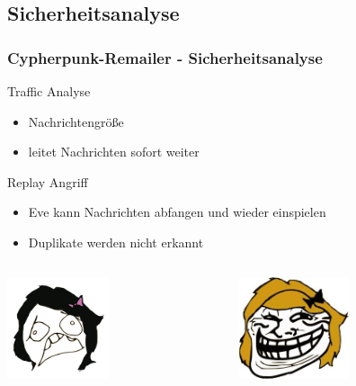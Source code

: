 \documentclass{beamer}
\begin{document}
\subsection{Sicherheitsanalyse}
\begin{frame}
	\frametitle{Cypherpunk-Remailer - Sicherheitsanalyse}
	\begin{alertblock}{Traffic Analyse}	
		\begin{itemize}	
			\item Nachrichtengröße
			\item leitet Nachrichten sofort weiter
		\end{itemize}	
	\end{alertblock}

	\begin{alertblock}{Replay Angriff}	
		\begin{itemize}	
			\item Eve kann Nachrichten abfangen und wieder einspielen
			\item Duplikate werden nicht erkannt
		\end{itemize}	
	\end{alertblock}

	\begin{columns}[T]
		\begin{column}[T]{5cm}
			\begin{center}
				\includegraphics[height=3cm]{bilder/alice_sad.jpg}
			\end{center}
		\end{column}
		\begin{column}[T]{5cm}
			\begin{center}	
				\includegraphics[height=3cm]{bilder/eve.jpg}
			\end{center}
		\end{column}
	\end{columns}	
\end{frame}	
\end{document}
